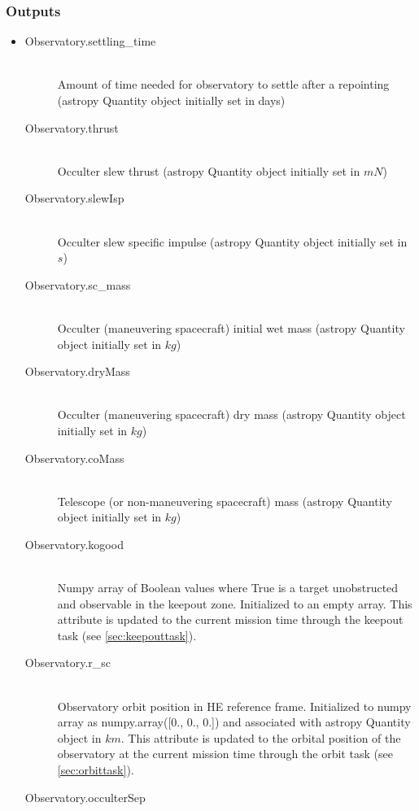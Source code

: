 \documentclass[cleanfoot]{asme2ej}
\begin{document}
\subsubsection*{Outputs}
\begin{itemize}
    \item
    \begin{description}
        \item[Observatory.settling\_time] \hfill \\
        Amount of time needed for observatory to settle after a repointing (astropy Quantity object initially set in days)
        \item[Observatory.thrust] \hfill \\
        Occulter slew thrust (astropy Quantity object initially set in $ mN $)
        \item[Observatory.slewIsp] \hfill \\
        Occulter slew specific impulse (astropy Quantity object initially set in $ s $)
        \item[Observatory.sc\_mass] \hfill \\
        Occulter (maneuvering spacecraft) initial wet mass (astropy Quantity object initially set in $ kg $)
        \item[Observatory.dryMass] \hfill \\
        Occulter (maneuvering spacecraft) dry mass (astropy Quantity object initially set in $ kg $)
        \item[Observatory.coMass] \hfill \\
        Telescope (or non-maneuvering spacecraft) mass (astropy Quantity object initially set in $ kg $)
        \item[Observatory.kogood] \hfill \\
        Numpy array of Boolean values where True is a target unobstructed and observable in the keepout zone. Initialized to an empty array. This attribute is updated to the current mission time through the keepout task (see \ref{sec:keepouttask}).
        \item[Observatory.r\_sc] \hfill \\
        Observatory orbit position in HE reference frame. Initialized to numpy array as numpy.array([0., 0., 0.]) and associated with astropy Quantity object in $ km $. This attribute is updated to the orbital position of the observatory at the current mission time through the orbit task (see \ref{sec:orbittask}).
        \item[Observatory.occulterSep] \hfill \\

\end{description}
\end{itemize}
\end{document}
